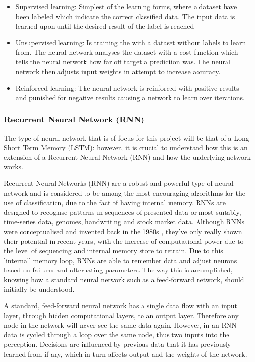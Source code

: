\documentclass[oneside, 12pt]{article}
\begin{document}
			\begin{itemize}
				\item Supervised learning: Simplest of the learning forms, where a dataset have been labeled which indicate the correct classified data. The input data is learned upon until the desired result of the label is reached \cite{SupdictL}
				\item Unsupervised learning: Is training the with a dataset without labels to learn from. The neural network analyses the dataset with a cost function which tells the neural network how far off target a prediction was. The neural network then adjusts input weights in attempt to increase accuracy. \cite{WhatNN}
				\item Reinforced learning: The neural network is reinforced with positive results and punished for negative results causing a network to learn over iterations. 
			\end{itemize}
		
			\subsubsection{Recurrent Neural Network (RNN)}\label{types}
			The type of neural network that is of focus for this project will be that of a Long-Short Term Memory (LSTM); however, it is crucial to understand how this is an extension of a Recurrent Neural Network (RNN) and how the underlying network works.
			
			Recurrent Neural Networks (RNN) are a robust and powerful type of neural network and is considered to be among the most encouraging algorithms for the use of classification, due to the fact of having internal memory. RNNs are designed to recognise patterns in sequences of presented data or most suitably, time-series data, genomes, handwriting and stock market data. Although RNNs were conceptualised and invented back in the 1980s \cite{ErrorProp}, they've only really shown their potential in recent years, with the increase of computational power due to the level of sequencing and internal memory store to retrain.
			Due to this 'internal' memory loop, RNNs are able to remember data and adjust neurons based on failures and alternating parameters. The way this is accomplished, knowing how a standard neural network such as a feed-forward network, should initially be understood. \cite{BeginLSTMRNN}
			
			A standard, feed-forward neural network has a single data flow with an input layer, through hidden computational layers, to an output layer. Therefore any node in the network will never see the same data again. However, in an RNN data is cycled through a loop over the same node, thus two inputs into the perception. Decisions are influenced by previous data that it has previously learned from if any, which in turn affects output and the weights of the network. \cite{RNNLSTMtds}
			
\end{document}
